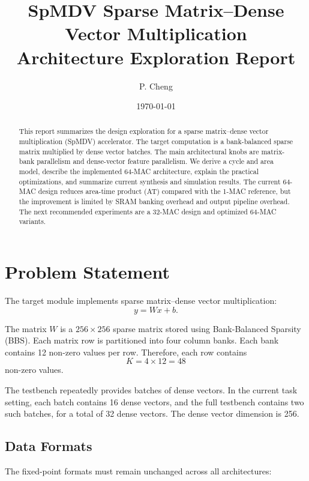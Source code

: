 \documentclass[11pt,a4paper]{article}
\title{SpMDV Sparse Matrix--Dense Vector Multiplication\\Architecture Exploration Report}
\author{P. Cheng}
\date{\today}
\begin{document}
\maketitle

\begin{abstract}
This report summarizes the design exploration for a sparse matrix--dense vector multiplication (SpMDV) accelerator. The target computation is a bank-balanced sparse matrix multiplied by dense vector batches. The main architectural knobs are matrix-bank parallelism and dense-vector feature parallelism. We derive a cycle and area model, describe the implemented 64-MAC architecture, explain the practical optimizations, and summarize current synthesis and simulation results. The current 64-MAC design reduces area-time product (AT) compared with the 1-MAC reference, but the improvement is limited by SRAM banking overhead and output pipeline overhead. The next recommended experiments are a 32-MAC design and optimized 64-MAC variants.
\end{abstract}

\section{Problem Statement}

The target module implements sparse matrix--dense vector multiplication:
\begin{equation}
    y = Wx + b.
\end{equation}

The matrix $W$ is a $256 \times 256$ sparse matrix stored using Bank-Balanced Sparsity (BBS). Each matrix row is partitioned into four column banks. Each bank contains 12 non-zero values per row. Therefore, each row contains
\begin{equation}
    K = 4 \times 12 = 48
\end{equation}
non-zero values.

The testbench repeatedly provides batches of dense vectors. In the current task setting, each batch contains 16 dense vectors, and the full testbench contains two such batches, for a total of 32 dense vectors. The dense vector dimension is 256.

\subsection{Data Formats}

The fixed-point formats must remain unchanged across all architectures:
\end{document}
